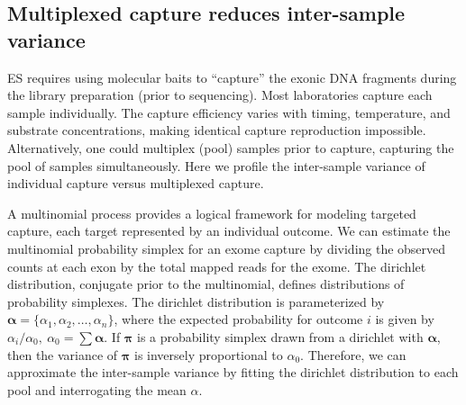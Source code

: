 \documentclass[11pt,letterpaper,oneside]{book}
\begin{document}
\hypertarget{multiplexed-capture-reduces-inter-sample-variance}{%
\subsection{Multiplexed capture reduces inter-sample variance}\label{multiplexed-capture-reduces-inter-sample-variance}}

ES requires using molecular baits to ``capture'' the exonic DNA fragments during the library preparation (prior to sequencing).
Most laboratories capture each sample individually.
The capture efficiency varies with timing, temperature, and substrate concentrations, making identical capture reproduction impossible.
Alternatively, one could multiplex (pool) samples prior to capture, capturing the pool of samples simultaneously.
Here we profile the inter-sample variance of individual capture versus multiplexed capture.

A multinomial process provides a logical framework for modeling targeted capture, each target represented by an individual outcome.
We can estimate the multinomial probability simplex for an exome capture by dividing the observed counts at each exon by the total mapped reads for the exome.
The dirichlet distribution, conjugate prior to the multinomial, defines distributions of probability simplexes.
The dirichlet distribution is parameterized by \(\boldsymbol{\alpha} = \{\alpha_1, \alpha_2, \dots, \alpha_n\}\), where the expected probability for outcome \(i\) is given by \(\alpha_i/\alpha_0,~\alpha_0 = \sum \boldsymbol\alpha\).
If \(\boldsymbol\pi\) is a probability simplex drawn from a dirichlet with \(\boldsymbol\alpha\), then the variance of \(\boldsymbol\pi\) is inversely proportional to \(\alpha_0\).
Therefore, we can approximate the inter-sample variance by fitting the dirichlet distribution to each pool and interrogating the mean \(\alpha\).
\end{document}
